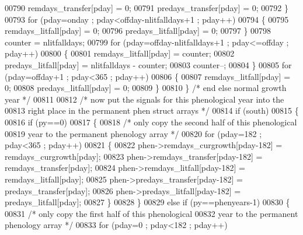\begin{DoxyCode}
{{{{{{{00790                     remdays\_transfer[pday] = 0;
00791                     predays\_transfer[pday] = 0;
00792                 \}
00793                 \textcolor{keywordflow}{for} (pday=onday ; pday<offday-nlitfalldays+1 ; pday++)
00794                 \{
00795                     remdays\_litfall[pday] = 0;
00796                     predays\_litfall[pday] = 0;
00797                 \}
00798                 counter = nlitfalldays;
00799                 \textcolor{keywordflow}{for} (pday=offday-nlitfalldays+1 ; pday<=offday ; pday++)
00800                 \{
00801                     remdays\_litfall[pday] = counter;
00802                     predays\_litfall[pday] = nlitfalldays - counter;
00803                     counter--;
00804                 \}
00805                 \textcolor{keywordflow}{for} (pday=offday+1 ; pday<365 ; pday++)
00806                 \{
00807                     remdays\_litfall[pday] = 0;
00808                     predays\_litfall[pday] = 0;
00809                 \}
00810             \} \textcolor{comment}{/* end else normal growth year */}
00811             
00812             \textcolor{comment}{/* now put the signals for this phenological year into the}
00813 \textcolor{comment}{            right place in the permanent phen struct arrays */} 
00814             \textcolor{keywordflow}{if} (south)
00815             \{
00816                 \textcolor{keywordflow}{if} (py==0)
00817                 \{
00818                     \textcolor{comment}{/* only copy the second half of this phenological}
00819 \textcolor{comment}{                    year to the permanent phenology array */}
00820                     \textcolor{keywordflow}{for} (pday=182 ; pday<365 ; pday++)
00821                     \{
00822                         phen->remdays\_curgrowth[pday-182] = remdays\_curgrowth[pday];
00823                         phen->remdays\_transfer[pday-182] = remdays\_transfer[pday];
00824                         phen->remdays\_litfall[pday-182] = remdays\_litfall[pday];
00825                         phen->predays\_transfer[pday-182] = predays\_transfer[pday];
00826                         phen->predays\_litfall[pday-182] = predays\_litfall[pday];
00827                     \}
00828                 \}
00829                 \textcolor{keywordflow}{else} \textcolor{keywordflow}{if} (py==phenyears-1)
00830                 \{
00831                     \textcolor{comment}{/* only copy the first half of this phenological}
00832 \textcolor{comment}{                    year to the permanent phenology array */}
00833                     \textcolor{keywordflow}{for} (pday=0 ; pday<182 ; pday++)
}}}}}}}
\end{DoxyCode}
